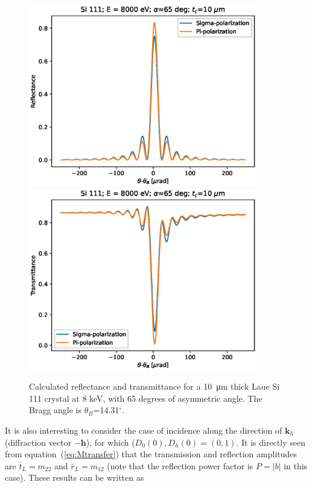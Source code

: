 \documentclass{iucr}
\begin{document}
\begin{figure}\label{fig:laueProfiles}
    \centering
    \includegraphics[width=0.89\textwidth]{figures/Laue_1.eps}
    \includegraphics[width=0.89\textwidth]{figures/Laue_2.eps}
    \caption{Calculated reflectance and transmittance for a \SI{10}{\micro\meter} thick Laue Si 111 crystal at 8 keV, with 65 degrees of asymmetric angle. The Bragg angle is $\theta_B$=14.31$^\circ$.}
\end{figure}

It is also interesting to consider the case of incidence along the direction of $\textbf{k}_h$ (diffraction vector $-\textbf{h}$), for which ($D_0(0), D_h(0)=(0,1)$. It is directly seen from equation~(\ref{eq:Mtransfer}) that the transmission and reflection amplitudes are $\bar{t}_L=m_{22}$ and $\bar{r}_L=m_{12}$ (note that the reflection power factor is $P=|b|$ in this case). These results can be written as
\end{document}
